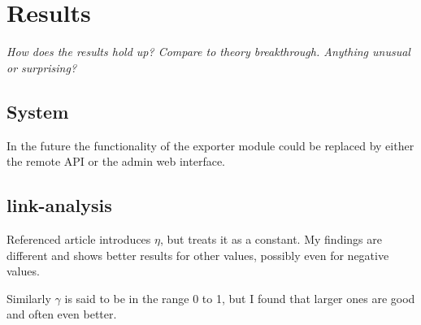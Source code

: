 
\section{Results}\label{sec:disc:results}

\textit{How does the results hold up? Compare to theory breakthrough. Anything unusual or surprising?}

\subsection{System}

In the future the functionality of the exporter module could be replaced by either the remote API or the admin web interface.


\subsection{link-analysis}

Referenced article introduces $\eta$, but treats it as a constant. My findings are different and shows better results for other values, possibly even for negative values.

Similarly $\gamma$ is said to be in the range 0 to 1, but I found that larger ones are good and often even better.

